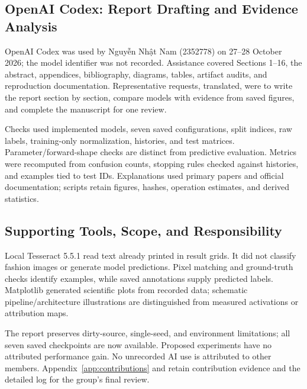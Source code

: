 \subsection*{OpenAI Codex: Report Drafting and Evidence Analysis}

OpenAI Codex was used by Nguyễn Nhật Nam (2352778) on 27--28 October 2026; the model identifier was not recorded. Assistance covered Sections 1--16, the abstract, appendices, bibliography, diagrams, tables, artifact audits, and reproduction documentation. Representative requests, translated, were to write the report section by section, compare models with evidence from saved figures, and complete the manuscript for one review.

Checks used implemented models, seven saved configurations, split indices, raw labels, training-only normalization, histories, and test matrices. Parameter/forward-shape checks are distinct from predictive evaluation. Metrics were recomputed from confusion counts, stopping rules checked against histories, and examples tied to test IDs. Explanations used primary papers and official documentation; scripts retain figures, hashes, operation estimates, and derived statistics.

\subsection*{Supporting Tools, Scope, and Responsibility}

Local Tesseract 5.5.1 read text already printed in result grids. It did not classify fashion images or generate model predictions. Pixel matching and ground-truth checks identify examples, while saved annotations supply predicted labels. Matplotlib generated scientific plots from recorded data; schematic pipeline/architecture illustrations are distinguished from measured activations or attribution maps.

The report preserves dirty-source, single-seed, and environment limitations; all seven saved checkpoints are now available. Proposed experiments have no attributed performance gain. No unrecorded AI use is attributed to other members. Appendix~\ref{app:contributions} and  retain contribution evidence and the detailed log for the group's final review.
